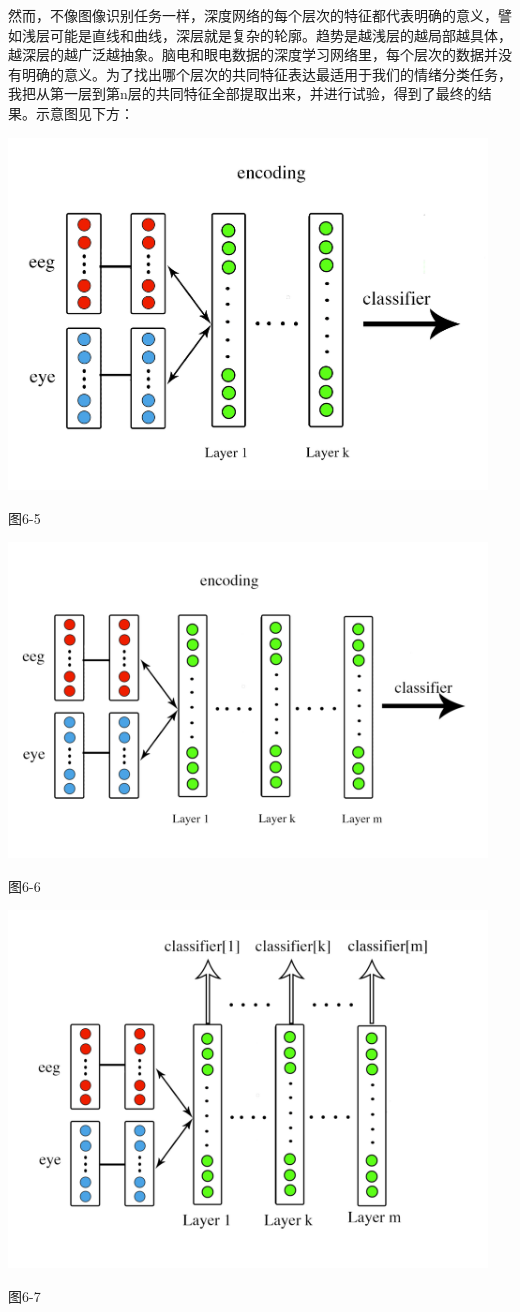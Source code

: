 		然而，不像图像识别任务一样，深度网络的每个层次的特征都代表明确的意义，譬如浅层可能是直线和曲线，深层就是复杂的轮廓。趋势是越浅层的越局部越具体，越深层的越广泛越抽象。脑电和眼电数据的深度学习网络里，每个层次的数据并没有明确的意义。为了找出哪个层次的共同特征表达最适用于我们的情绪分类任务，我把从第一层到第n层的共同特征全部提取出来，并进行试验，得到了最终的结果。示意图见下方：
		\centerline{\includegraphics[width=5in]{figure/classifyk.png}}
		\centerline{图6-5}
		\centerline{\includegraphics[width=5in]{figure/classifyn.png}}
		\centerline{图6-6}
		
		\centerline{\includegraphics[width=5in]{figure/classify_all.png}}
		\centerline{图6-7}
		
